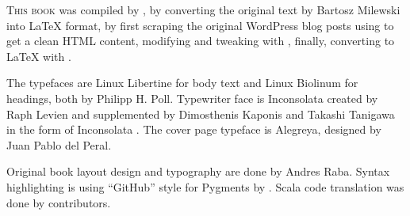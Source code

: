 \lettrine[lraise=-0.03,loversize=0.08]{T}{his book} was compiled by , by converting the original text by Bartosz Milewski into \LaTeX{} format, by
first scraping the original WordPress blog posts using 
to get a clean HTML content, modifying and tweaking with ,
finally, converting to LaTeX with .

The typefaces are Linux Libertine for body text and Linux Biolinum for headings, both by Philipp H. Poll. Typewriter face is Inconsolata
created by Raph Levien and supplemented by Dimosthenis Kaponis and Takashi Tanigawa in the form of Inconsolata . The cover page
typeface is Alegreya, designed by Juan Pablo del Peral.

Original book layout design and typography are done by Andres Raba. Syntax highlighting is using ``GitHub'' style for Pygments by
. Scala code translation was done by 
 contributors.